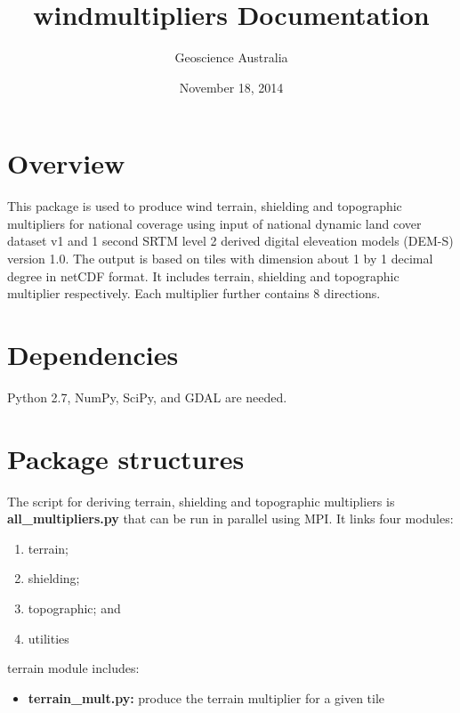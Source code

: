 \documentclass[letterpaper,10pt,english]{sphinxmanual}
\title{windmultipliers Documentation}
\date{November 18, 2014}
\author{Geoscience Australia}
\begin{document}
\maketitle
\tableofcontents
{}\label{index::doc}



\chapter{Overview}
\label{index:wind-multipliers}\label{index:overview}
This package is used to produce wind terrain, shielding and topographic multipliers for national coverage using input of national dynamic land cover dataset v1 and 1 second SRTM level 2 derived digital eleveation models (DEM-S) version 1.0. The output is based on tiles with dimension about 1 by 1 decimal degree in netCDF format. It includes terrain, shielding and topographic multiplier respectively. Each multiplier further contains 8 directions.


\chapter{Dependencies}
\label{index:dependencies}
Python 2.7, NumPy, SciPy, and GDAL are needed.


\chapter{Package structures}
\label{index:package-structures}
The script for deriving terrain, shielding and topographic multipliers is
\textbf{all\_multipliers.py} that can be run in parallel using MPI. It links four modules:
\begin{enumerate}
\item {} 
terrain;

\item {} 
shielding;

\item {} 
topographic; and

\item {} 
utilities

\end{enumerate}

terrain module includes:
\begin{itemize}
\item {} 
\textbf{terrain\_mult.py:} produce the terrain multiplier for a given tile

\end{itemize}
\end{document}
